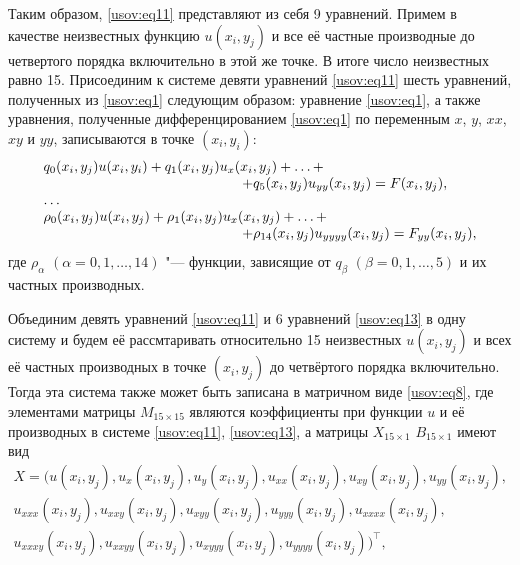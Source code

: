 Таким образом, \eqref{usov:eq11} представляют из себя 9 уравнений.
Примем в качестве неизвестных функцию $u(x_i,y_j)$ и все её
частные производные до четвертого порядка включительно в этой же
точке. В итоге число неизвестных равно 15. Присоединим к системе
девяти уравнений \eqref{usov:eq11} шесть уравнений, полученных из
\eqref{usov:eq1} следующим образом: уравнение \eqref{usov:eq1}, а
также уравнения, полученные дифференцированием \eqref{usov:eq1}
по переменным $x$, $y$, $xx$, $xy$ и $yy$, записываются в точке
$(x_i,y_i)$:
\begin{equation}
\label{usov:eq13}
\begin{array}{l}
q_0(x_i,y_j)u(x_i,y_i)+q_1(x_i,y_j)u_x(x_i,y_j)+ \ldots+
\\
\hspace{50mm}+
q_5(x_i,y_j) u_{yy}(x_i,y_j)=F(x_i,y_j),\\
\ldots \\
\rho_0(x_i,y_j)u(x_i,y_j)+\rho_1(x_i,y_j)u_x(x_i,y_j)+\ldots+
\\
\hspace{50mm}+
\rho_{14}(x_i,y_j)u_{yyyy}(x_i,y_j)=F_{yy}(x_i,y_j),
\end{array}
\end{equation}
где $\rho_\alpha$ $(\alpha=0, 1, \ldots, 14)$ "--- функции, зависящие
от $q_\beta$ $(\beta=0,1, \ldots,5)$ и их частных производных.

Объединим девять уравнений \eqref{usov:eq11} и 6 уравнений
\eqref{usov:eq13} в одну систему и будем её рассмтаривать
относительно 15 неизвестных $u(x_i,y_j)$ и всех её частных
производных в точке $(x_i, y_j)$ до четвёртого порядка
включительно. Тогда эта система также может быть записана в
матричном виде \eqref{usov:eq8}, где элементами матрицы
$M_{15\times 15}$ являются коэффициенты при функции $u$ и её
производных в системе \eqref{usov:eq11}, \eqref{usov:eq13}, а
матрицы $X_{15\times 1}$ $B_{15 \times 1}$ имеют вид
\begin{multline*}
X=\Big( u(x_i,y_j), u_x(x_i,y_j), u_y(x_i,y_j), u_{xx}(x_i,y_j),
u_{xy}(x_i,y_j), u_{yy}(x_i,y_j),\\
u_{xxx}(x_i,y_j), u_{xxy}(x_i,y_j), u_{xyy}(x_i,y_j), u_{yyy}
(x_i,y_j), u_{xxxx}(x_i,y_j),\\
u_{xxxy}(x_i,y_j),u_{xxyy}(x_i,y_j),u_{xyyy}(x_i,y_j),
u_{yyyy}(x_i,y_j) \Big)^\top,
\end{multline*}

\vspace{-8mm}

